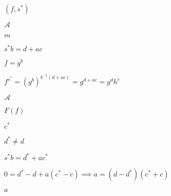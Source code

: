 \documentclass[10pt]{book}
\begin{document}
\begin{mdSnippets}
\begin{mdInlineSnippet}[6bb88234af389d7432e135ad3d41fd2c]
$(f,s^*)$\end{mdInlineSnippet}%
\begin{mdInlineSnippet}[ad70146b431bea9ae74cf8385470c544]%
$\mathcal{A}$\end{mdInlineSnippet}%
\begin{mdInlineSnippet}[6f8f57715090da2632453988d9a1501b]%
$m$\end{mdInlineSnippet}%
\begin{mdInlineSnippet}[4d61ea1576a179e49f4a6d70acb0f108]%
$s^*b = d + ac$\end{mdInlineSnippet}%
\begin{mdInlineSnippet}[ccbecf07374dd1b071330613139b9a07]%
$f = g^b$\end{mdInlineSnippet}%
\begin{mdInlineSnippet}[4b0b490f3e96f1bc999ef3b4c6aaee1d]%
$f^{s^*} = (g^b)^{b^{-1}(d + ac)} = g^{d+ac} = g^dh^c$\end{mdInlineSnippet}%
\begin{mdInlineSnippet}[ad70146b431bea9ae74cf8385470c544]%
$\mathcal{A}$\end{mdInlineSnippet}%
\begin{mdInlineSnippet}[0415bdac96c0175c9ae3810fe95784b9]%
$F(f)$\end{mdInlineSnippet}%
\begin{mdInlineSnippet}%
$c^*$\end{mdInlineSnippet}%
\begin{mdInlineSnippet}[0c2301f800594a5aedb7684660540329]%
$d^* \neq d$\end{mdInlineSnippet}%
\begin{mdInlineSnippet}%
$s^*b = d^* + ac^*$\end{mdInlineSnippet}%
\begin{mdInlineSnippet}[5e10644f41281a8691d64b35fe3addc1]%
$0 = d^{*}  - d + a(c^* - c) \implies a = (d - d^*)(c^* + c) $\end{mdInlineSnippet}%
\begin{mdInlineSnippet}[0cc175b9c0f1b6a831c399e269772661]%
$a$\end{mdInlineSnippet}%
\begin{mdInlineSnippet}[53bec379499db37e3da9dc4e435ee8fa]%

\end{mdInlineSnippet}
\end{mdSnippets}
\end{document}
